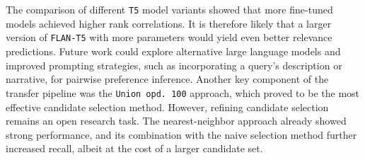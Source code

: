 \\\\
The comparison of different \texttt{T5} model variants showed that more fine-tuned models achieved higher rank correlations. It is therefore likely that a larger version of \texttt{FLAN-T5} with more parameters would yield even better relevance predictions. Future work could explore alternative large language models and improved prompting strategies, such as incorporating a query's description or narrative, for pairwise preference inference. Another key component of the transfer pipeline was the \texttt{Union opd.\ 100} approach, which proved to be the most effective candidate selection method. However, refining candidate selection remains an open research task. The nearest-neighbor approach already showed strong performance, and its combination with the naive selection method further increased recall, albeit at the cost of a larger candidate set.
